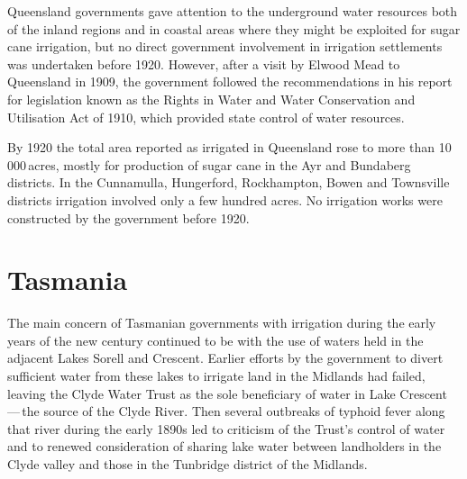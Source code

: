 Queensland governments gave attention to the underground water
resour\-ces both of the inland regions and in coastal areas where they
might be exploited for sugar cane irrigation, but no direct government
involvement in irrigation settlements was undertaken before 1920.
However, after a visit by Elwood Mead  to Queensland
in 1909, the government followed the recommendations in his report for
legislation known as the Rights in Water and Water Conservation and
Utilisation Act of  1910, which provided state control
of water resources.

By 1920 the total area reported as irrigated in Queensland rose to
more than 10\,000\,acres, mostly for production of sugar cane in the
Ayr and Bundaberg districts.  In the Cunnamulla, Hungerford,
Rockhampton, Bowen and Townsville districts irrigation involved only a
few hundred acres.  No irrigation works were constructed by the
government before 1920.

\section*{Tasmania}

The main concern of Tasmanian governments with irrigation during the
early years of the new century continued to be with the use of waters
held in the adjacent Lakes Sorell  and Crescent.
 Earlier efforts by the government to divert
sufficient water from these lakes to irrigate land in the Midlands had
failed, leaving the Clyde Water Trust as the sole beneficiary of water
in Lake Crescent\,---\,the source of the Clyde
River.  Then several outbreaks of
typhoid fever along that river during the early
1890s led to criticism of the Trust's control of water and to renewed
consideration of sharing lake water between landholders in the Clyde
valley and those in the Tunbridge district
of the Midlands.

